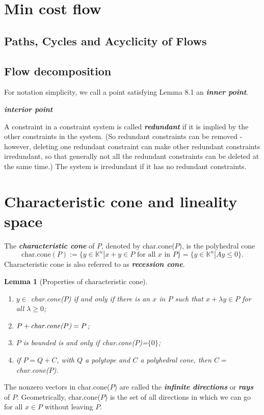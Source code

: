\documentclass{article}
\newtheorem{lemma}[theorem]{Lemma}
\def\K{{\mathbb K}}
\begin{document}
\section{Min cost flow}

\subsection{Paths, Cycles and Acyclicity of Flows }

\subsection{Flow decomposition}



For notation simplicity, we call a point satisfying Lemma 8.1 an \emph{\textbf{inner point}}.

\emph{\textbf{interior point}}

A constraint in a constraint system is called \emph{\textbf{redundant}} if it is implied by the other constraints in the system. (So redundant constraints can be removed - however, deleting one redundant constraint can make other redundant constraints irredundant, so that generally  not all the redundant  constraints can be deleted at the same time.) The system is irredundant if it has no redundant constraints.

\section{Characteristic cone and lineality space}
The \emph{\textbf{characteristic cone}} of $P$, denoted by char.cone($P$), is the polyhedral cone
$$\mbox{char.cone}(P):=\{y\in \K^n|x+y\in P\mbox{~for all~}x \mbox{~in~} P\}=\{y\in\K^n|Ay\leq 0\}.$$
Characteristic cone is also referred to as \emph{\textbf{recession cone}}.

\begin{lemma}[Properties of characteristic cone] \hfill
  \begin{enumerate}
    \item[\emph{(i)}] $y\in$ \emph{char.cone($P$)} if and only if there is an $x$ in $P$ such that $x+\lambda y\in P$ for all $\lambda\geq 0$;
    \item[\emph{(ii)}] $P+\mbox{\emph{char.cone($P$)}}=P$;
    \item[\emph{(iii)}] $P$ is bounded is and only if \emph{char.cone($P$)}=$\{0\}$;
    \item[\emph{(iv)}] if $P=Q+C$, with $Q$  a polytope and $C$ a polyhedral cone, then $C=$\emph{char.cone($P$)}.
  \end{enumerate}
\end{lemma}
The nonzero vectors in char.cone($P$) are called the \emph{\textbf{infinite directions}} or \emph{\textbf{rays}} of $P$. Geometrically, char.cone($P$) is the set of all directions in which we can go for all $x\in P$ without leaving $P$.
\end{document}
